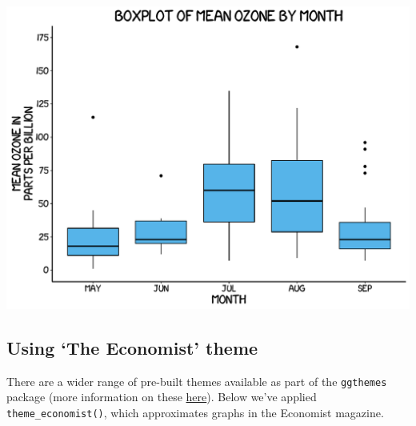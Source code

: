 \documentclass[]{article}
\begin{document}
\begin{center}\includegraphics{0_all_posts_pdf/box_11-1} \end{center}

\subsection{\texorpdfstring{Using `The Economist'
theme}{Using The Economist theme}}\label{using-the-economist-theme-9}

There are a wider range of pre-built themes available as part of the
\texttt{ggthemes} package (more information on these
\href{https://cran.r-project.org/web/packages/ggthemes/vignettes/ggthemes.html}{here}).
Below we've applied \texttt{theme\_economist()}, which approximates
graphs in the Economist magazine.
\end{document}
